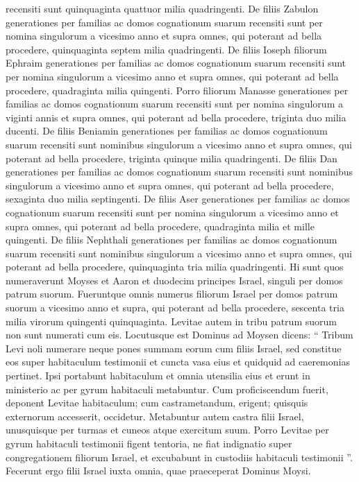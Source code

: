 \begin{biblechapter}
 \verse recensiti sunt quinquaginta quattuor milia quadringenti.
 \verse De filiis Zabulon generationes per familias ac domos cognationum suarum recensiti sunt per nomina singulorum a vicesimo anno et supra omnes, qui poterant ad bella procedere, 
\verse quinquaginta septem milia quadringenti.
 \verse De filiis Ioseph filiorum Ephraim generationes per familias ac domos cognationum suarum recensiti sunt per nomina singulorum a vicesimo anno et supra omnes, qui poterant ad bella procedere, 
\verse quadraginta milia quingenti.
 \verse Porro filiorum Manasse generationes per familias ac domos cognationum suarum recensiti sunt per nomina singulorum a viginti annis et supra omnes, qui poterant ad bella procedere, 
\verse triginta duo milia ducenti.
 \verse De filiis Beniamin generationes per familias ac domos cognationum suarum recensiti sunt nominibus singulorum a vicesimo anno et supra omnes, qui poterant ad bella procedere, 
\verse triginta quinque milia quadringenti.
 \verse De filiis Dan generationes per familias ac domos cognationum suarum recensiti sunt nominibus singulorum a vicesimo anno et supra omnes, qui poterant ad bella procedere, 
\verse sexaginta duo milia septingenti.
 \verse De filiis Aser generationes per familias ac domos cognationum suarum recensiti sunt per nomina singulorum a vicesimo anno et supra omnes, qui poterant ad bella procedere, 
\verse quadraginta milia et mille quingenti.
 \verse De filiis Nephthali generationes per familias ac domos cognationum suarum recensiti sunt nominibus singulorum a vicesimo anno et supra omnes, qui poterant ad bella procedere, 
\verse quinquaginta tria milia quadringenti.
 \verse Hi sunt quos numeraverunt Moyses et Aaron et duodecim principes Israel, singuli per domos patrum suorum. 
\verse Fueruntque omnis numerus filiorum Israel per domos patrum suorum a vicesimo anno et supra, qui poterant ad bella procedere, \verse sescenta tria milia virorum quingenti quinquaginta.
 \verse Levitae autem in tribu patrum suorum non sunt numerati cum eis. 
\verse Locutusque est Dominus ad Moysen dicens: 
\verse “ Tribum Levi noli numerare neque pones summam eorum cum filiis Israel, 
\verse sed constitue eos super habitaculum testimonii et cuncta vasa eius et quidquid ad caeremonias pertinet. Ipsi portabunt habitaculum et omnia utensilia eius et erunt in ministerio ac per gyrum habitaculi metabuntur. 
\verse Cum proficiscendum fuerit, deponent Levitae habitaculum; cum castrametandum, erigent; quisquis externorum accesserit, occidetur. 
\verse Metabuntur autem castra filii Israel, unusquisque per turmas et cuneos atque exercitum suum. 
\verse Porro Levitae per gyrum habitaculi testimonii figent tentoria, ne fiat indignatio super congregationem filiorum Israel, et excubabunt in custodiis habitaculi testimonii ”.
 \verse Fecerunt ergo filii Israel iuxta omnia, quae praeceperat Dominus Moysi.
 

\end{biblechapter}
